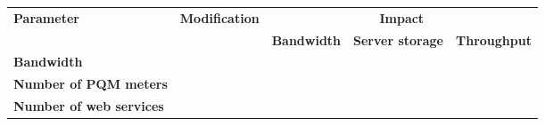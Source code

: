 \begin{table}[h]
\centering
\begin{tabular}{l|c|c|c|c}
\hline
\multicolumn{1}{l|}{\multirow{2}{*}{\textbf{Parameter}}} & \multicolumn{1}{c|}{\multirow{2}{*}{\textbf{Modification}}} & \multicolumn{3}{c}{\textbf{Impact}}                                                                                                  \\ \cline{3-5} 
\multicolumn{1}{c|}{} & \multicolumn{1}{c|}{}  & \multicolumn{1}{c|}{\textbf{Bandwidth}} & \multicolumn{1}{c|}{\textbf{Server storage}} & \multicolumn{1}{c}{\textbf{Throughput}} \\ \hline \hline
\multirow{2}{*}{\textbf{Bandwidth}} & \cellcolor{green} & \cellcolor{green} &\cellcolor{yellow}&\cellcolor{yellow}\\
\cline{2-5} 
                                                         & \cellcolor{red}                                                           & \cellcolor{red}                                       &\cellcolor{yellow}                                                &\cellcolor{yellow}                                      \\ \hline
\multirow{2}{*}{\textbf{Number of PQM meters}}           & \cellcolor{green}                                                           & \cellcolor{green}                                       & \cellcolor{green}                                                 & \cellcolor{red}                                       \\ \cline{2-5} 
                                                         & \cellcolor{red}                                                           & \cellcolor{red}                                       & \cellcolor{red}                                                 & \cellcolor{green}                                       \\ \hline
\multirow{2}{*}{\textbf{Number of web services}}          & \cellcolor{green}                                                           &\cellcolor{yellow}                                      &\cellcolor{yellow}                                                & \cellcolor{green}                                       \\ \cline{2-5} 
                                                         & \cellcolor{red}                                                           &\cellcolor{yellow}                                      &\cellcolor{yellow}                                                & \cellcolor{red}                                       \\ \hline

\end{tabular}
\end{table}
